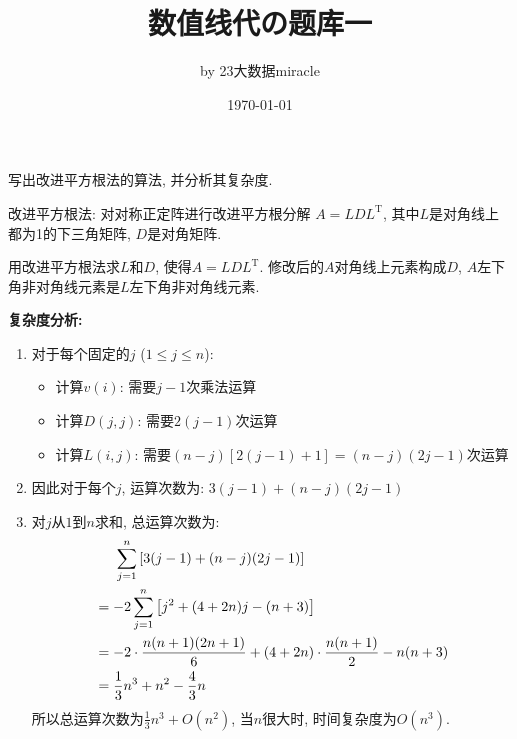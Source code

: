 \documentclass[12pt, answers]{exam}     %
\title{数值线代の题库一}
\author{by 23大数据miracle}
\date{\today}
\newcommand{\T}{\mathrm{T}}
\begin{document}
\maketitle

\begin{questions}
\question{}
写出改进平方根法的算法, 并分析其复杂度. 

\begin{solution}
改进平方根法: 对对称正定阵进行改进平方根分解 $A = LDL^{\T}$, 其中$L$是对角线上都为1的下三角矩阵, $D$是对角矩阵.

\begin{algorithm}[H]
\caption{用改进平方根法求$L$和$D$, 使得$A = LDL^{\T}$. 修改后的$A$对角线上元素构成$D$, $A$左下角非对角线元素是$L$左下角非对角线元素.}
\end{algorithm}

\textbf{复杂度分析:}
\begin{enumerate}
    \item 对于每个固定的$j$ ($1 \leq j \leq n$):
        \begin{itemize}
            \item 计算$v(i)$: 需要$j-1$次乘法运算
            \item 计算$D(j,j)$: 需要$2(j-1)$次运算
            \item 计算$L(i,j)$: 需要$(n-j)[2(j-1)+1] = (n-j)(2j-1)$次运算
        \end{itemize}
    \item 因此对于每个$j$, 运算次数为: $3(j-1) + (n-j)(2j-1)$
    \item 对$j$从$1$到$n$求和, 总运算次数为: 
        \begin{align*}
            &\hspace{5mm} \sum_{j=1}^n \left[3(j-1) + (n-j)(2j-1)\right] \\
            &= -2\sum_{j=1}^n \left[j^2 + (4 + 2n)j - (n + 3)\right] \\
            &= -2 \cdot \frac{n(n+1)(2n+1)}{6} + (4+2n) \cdot \frac{n(n+1)}{2} - n(n+3) \\
            &= \frac{1}{3}n^3 + n^2 - \frac{4}{3}n
        \end{align*}
        所以总运算次数为$\frac{1}{3}n^3 + O(n^2)$, 当$n$很大时, 时间复杂度为$O(n^3)$. 
\end{enumerate}
\end{solution}


\end{questions}
\end{document}

